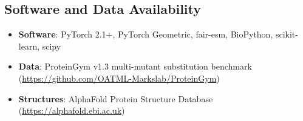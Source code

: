 \documentclass{article}
\begin{document}
\subsection{Software and Data Availability}

\begin{itemize}
    \item \textbf{Software}: PyTorch 2.1+, PyTorch Geometric, fair-esm, BioPython, scikit-learn, scipy
    \item \textbf{Data}: ProteinGym v1.3 multi-mutant substitution benchmark (\url{https://github.com/OATML-Markslab/ProteinGym})
    \item \textbf{Structures}: AlphaFold Protein Structure Database (\url{https://alphafold.ebi.ac.uk})
\end{itemize}
\end{document}
